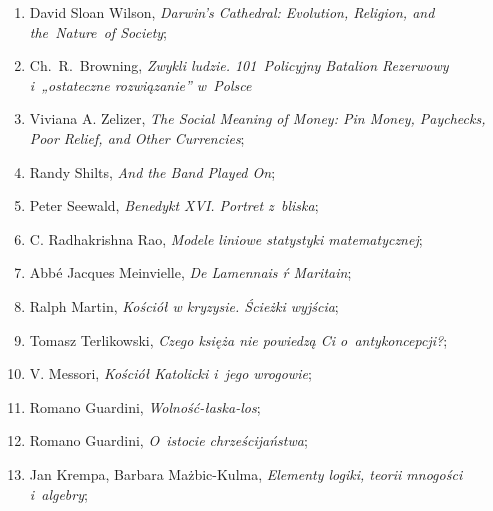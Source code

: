 \documentclass[a4paper,11pt]{article}
\begin{document}
\begin{enumerate}
\item David Sloan Wilson, \textit{Darwin's Cathedral: Evolution,
    Religion, and the~Nature~of Society};



\item Ch.~R.~Browning, \textit{Zwykli ludzie. 101~Policyjny Batalion
    Rezerwowy i~„ostateczne rozwiązanie” w~Polsce}



\item Viviana A. Zelizer, \textit{The Social Meaning of Money: Pin
    Money, Paychecks, Poor Relief, and Other Currencies};



\item Randy Shilts, \textit{And the Band Played On};



\item Peter Seewald, \textit{Benedykt XVI. Portret z~bliska};



\item C. Radhakrishna Rao, \textit{Modele liniowe statystyki matematycznej};



\item Abbé Jacques Meinvielle, \textit{De Lamennais ŕ Maritain};



\item Ralph Martin, \textit{Kościół w kryzysie. Ścieżki wyjścia};



\item Tomasz Terlikowski, \textit{Czego księża nie powiedzą Ci
    o~antykoncepcji?};



\item V. Messori, \textit{Kościół Katolicki i~jego wrogowie};



\item Romano Guardini, \textit{Wolność-łaska-los};



\item Romano Guardini, \textit{O~istocie chrześcijaństwa};



\item Jan Krempa, Barbara Mażbic-Kulma, \textit{Elementy logiki, teorii
    mnogości i~algebry};




\end{enumerate}
\end{document}
